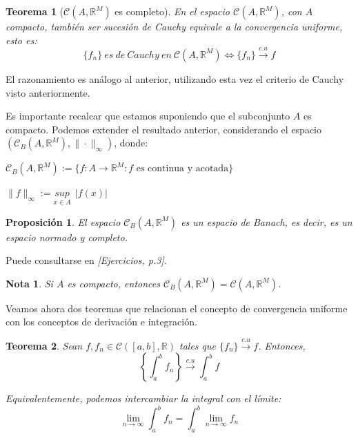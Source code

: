\documentclass[11pt, a4paper]{article}
\makeatletter
\newif\IfInSansMode
\let\oldsf\sffamily
\renewcommand*{\sffamily}{\oldsf\mathversion{sans}\InSansModetrue}
\let\oldnorm\normalfont
\renewcommand*{\normalfont}{\oldnorm\InSansModefalse\mathversion{normal}}
\newcommand{\R}{\mathbb{R}} \newcommand{\N}{\mathbb{N}}
\newcommand{\fn}{\{f_n\}}
\renewenvironment{proof}[1][\proofname] {\par\pushQED{\qed}\normalfont\topsep6\p@\@plus6\p@\relax\trivlist\item[\hskip\labelsep\itshape\sffamily#1\@addpunct{.}]\ignorespaces}{\popQED\endtrivlist\@endpefalse}
\theoremstyle{theorem-style}
\newtheorem{nth}{Teorema}[section]
\newtheorem{nprop}{Proposición}[section]
\theoremstyle{definition-style}
\theoremstyle{remark-style}
\newtheorem*{nota}{Nota}
\theoremstyle{example-style}
\makeatother
\begin{document}
\begin{nth}[$\mathcal{C}(A,\R^M)$ es completo] \label{3} En el espacio $\mathcal{C}(A,\mathbb{R}^M)$, con $A$ compacto, también ser sucesión de Cauchy equivale a la convergencia uniforme, esto es: $$\fn\ es\ de\ Cauchy\ en\ \mathcal{C}(A,\mathbb{R}^M) \iff \fn \xrightarrow {c.u} f $$
\end{nth}

  \begin{proof} El razonamiento es análogo al anterior, utilizando esta vez el criterio de Cauchy visto anteriormente.
  \end{proof}

Es importante recalcar que estamos suponiendo que el subconjunto $A$ es compacto. Podemos extender el resultado anterior, considerando el espacio $(\mathcal{C}_B(A,\mathbb{R}^M), \|\cdot\|_{\infty})$, donde: 

$\mathcal{C}_B(A,\mathbb{R}^M) := \{ f:A \longrightarrow \mathbb{R}^M: \text{$f$ es continua y acotada}\}$

$\|f\|_{\infty} := \underset{x \in A}{sup} \ \ |f(x)|$

\begin{nprop} El espacio $\mathcal{C}_B(A, \mathbb{R}^M)$ es un espacio de Banach, es decir, es un espacio normado y completo.
\end{nprop}

  \begin{proof}


    Puede consultarse en \textit{[Ejercicios, p.3]}.
  \end{proof}


\begin{nota}
  Si $A$ es compacto, entonces  $\mathcal{C}_B(A,\mathbb{R}^M) = \mathcal{C}(A, \mathbb{R}^M)$.
\end{nota}

Veamos ahora dos teoremas que relacionan el concepto de convergencia uniforme con los conceptos de derivación e integración.

\begin{nth} \label{4} Sean $f, f_n \in \mathcal{C}([a,b],\mathbb{R})$ tales que $\fn \xrightarrow {c.u} f$. Entonces, $$\left\{\int_a^b f_n\right\} \xrightarrow {c.u} \int_a^b f $$

  Equivalentemente, podemos intercambiar la integral con el límite: $$\lim_{n\rightarrow \infty} \int_a^b f_n = \int_a^b \lim_{n\rightarrow \infty} f_n$$
\end{nth}
\end{document}
